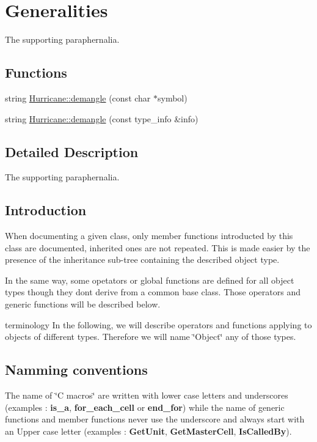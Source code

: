 \hypertarget{group__Generalities}{}\section{Generalities}
\label{group__Generalities}


The supporting paraphernalia.  


\subsection*{Functions}
\begin{DoxyCompactItemize}
\item 
string \mbox{\hyperlink{group__Generalities_ga93af87d1b7b19294382ba6dae51d0363}{Hurricane\+::demangle}} (const char $\ast$symbol)
\item 
string \mbox{\hyperlink{group__Generalities_gae4be209e8a3f2227b0c7a22246817c6f}{Hurricane\+::demangle}} (const type\+\_\+info \&info)
\end{DoxyCompactItemize}


\subsection{Detailed Description}
The supporting paraphernalia. 

\hypertarget{group__Generalities_secGeneralitiesIntro}{}\subsection{Introduction}\label{group__Generalities_secGeneralitiesIntro}
When documenting a given class, only member functions introducted by this class are documented, inherited ones are not repeated. This is made easier by the presence of the inheritance sub-\/tree containing the described object type.

In the same way, some opetators or global functions are defined for all object types though they don\textquotesingle{}t derive from a common base class. Those operators and generic functions will be described below.

terminology In the following, we will describe operators and functions applying to objects of different types. Therefore we will name \char`\"{}\+Object\char`\"{} any of those types.\hypertarget{group__Generalities_secGeneralitiesNammingConventions}{}\subsection{Namming conventions}\label{group__Generalities_secGeneralitiesNammingConventions}
The name of \char`\"{}\+C macros\char`\"{} are written with lower case letters and underscores (examples \+: {\bfseries is\+\_\+a}, {\bfseries for\+\_\+each\+\_\+cell} or {\bfseries end\+\_\+for}) while the name of generic functions and member functions never use the underscore and always start with an Upper case letter (examples \+: {\bfseries Get\+Unit}, {\bfseries Get\+Master\+Cell}, {\bfseries Is\+Called\+By}).

